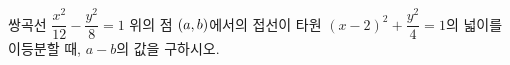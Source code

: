 쌍곡선 $\dfrac{x^2}{12}-\dfrac{y^2}{8}=1$ 위의 점 $(a{,}\mkern3mu\mathopen{}b)$에서의 접선이 타원 $(x-2)^2+\dfrac{y^2}{4}=1$의 넓이를 이등분할 때, $a-b$의 값을 구하시오. 
